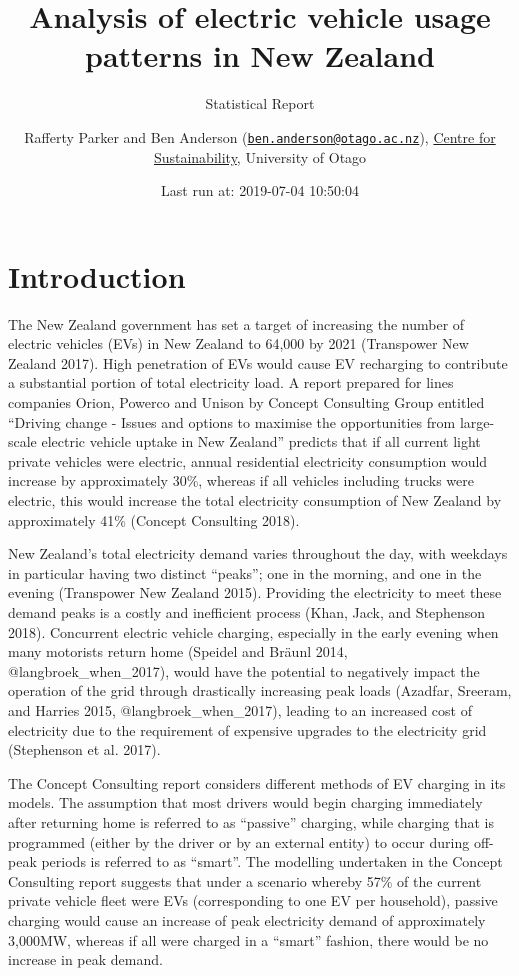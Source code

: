 \documentclass[]{article}
\title{Analysis of electric vehicle usage patterns in New Zealand}
\subtitle{Statistical Report}
\author{Rafferty Parker and Ben Anderson (\href{mailto:ben.anderson@otago.ac.nz}{\nolinkurl{ben.anderson@otago.ac.nz}}), \href{https://www.otago.ac.nz/centre-sustainability/}{Centre for Sustainability}, University of Otago}
\date{Last run at: 2019-07-04 10:50:04}
\begin{document}
\maketitle

{
\setcounter{tocdepth}{2}
\tableofcontents
}
\hypertarget{introduction}{%
\section{Introduction}\label{introduction}}

The New Zealand government has set a target of increasing the number of electric vehicles (EVs) in New Zealand to 64,000 by 2021 (Transpower New Zealand 2017). High penetration of EVs would cause EV recharging to contribute a substantial portion of total electricity load. A report prepared for lines companies Orion, Powerco and Unison by Concept Consulting Group entitled ``Driving change - Issues and options to maximise the opportunities from large-scale electric vehicle uptake in New Zealand'' predicts that if all current light private vehicles were electric, annual residential electricity consumption would increase by approximately 30\%, whereas if all vehicles including trucks were electric, this would increase the total electricity consumption of New Zealand by approximately 41\% (Concept Consulting 2018).

New Zealand's total electricity demand varies throughout the day, with weekdays in particular having two distinct ``peaks''; one in the morning, and one in the evening (Transpower New Zealand 2015). Providing the electricity to meet these demand peaks is a costly and inefficient process (Khan, Jack, and Stephenson 2018). Concurrent electric vehicle charging, especially in the early evening when many motorists return home (Speidel and Bräunl 2014, @langbroek\_when\_2017), would have the potential to negatively impact the operation of the grid through drastically increasing peak loads (Azadfar, Sreeram, and Harries 2015, @langbroek\_when\_2017), leading to an increased cost of electricity due to the requirement of expensive upgrades to the electricity grid (Stephenson et al. 2017).

The Concept Consulting report considers different methods of EV charging in its models. The assumption that most drivers would begin charging immediately after returning home is referred to as ``passive'' charging, while charging that is programmed (either by the driver or by an external entity) to occur during off-peak periods is referred to as ``smart''. The modelling undertaken in the Concept Consulting report suggests that under a scenario whereby 57\% of the current private vehicle fleet were EVs (corresponding to one EV per household), passive charging would cause an increase of peak electricity demand of approximately 3,000MW, whereas if all were charged in a ``smart'' fashion, there would be no increase in peak demand.
\end{document}
